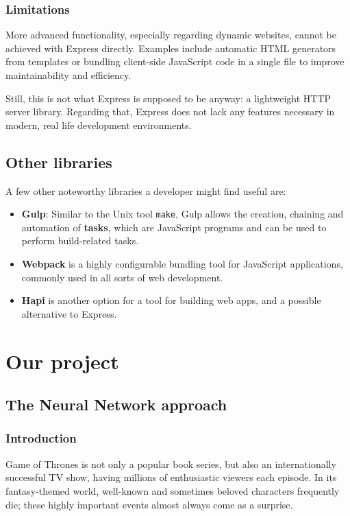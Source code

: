 \documentclass{bioinfo}
\begin{document}
\subsubsection{Limitations}

More advanced functionality, especially regarding dynamic websites, cannot be achieved with Express directly. Examples include automatic HTML generators from templates or bundling client-side JavaScript code in a single file to improve maintainability and efficiency.

Still, this is not what Express is supposed to be anyway: a lightweight HTTP server library. Regarding that, Express does not lack any features necessary in modern, real life development environments.

\subsection{Other libraries}
A few other noteworthy libraries a developer might find useful are:
\begin{itemize}
    \item \textbf{Gulp}: Similar to the Unix tool \texttt{make}, Gulp allows the creation, chaining and automation of \textbf{tasks}, which are JavaScript programs and can be used to perform build-related tasks. \cite{gulp}
    \item \textbf{Webpack} is a highly configurable bundling tool for JavaScript applications, commonly used in all sorts of web development. \cite{webpack}
    \item \textbf{Hapi} is another option for a tool for building web apps, and a possible alternative to Express. \cite{hapi}
\end{itemize}

\section{Our project}

\subsection{The Neural Network approach}

\subsubsection{Introduction}

Game of Thrones is not only a popular book series, but also an internationally successful TV show, having millions of enthusiastic viewers each episode. In its fantasy-themed world, well-known and sometimes beloved characters frequently die; these highly important events almost always come as a surprise.
\end{document}
